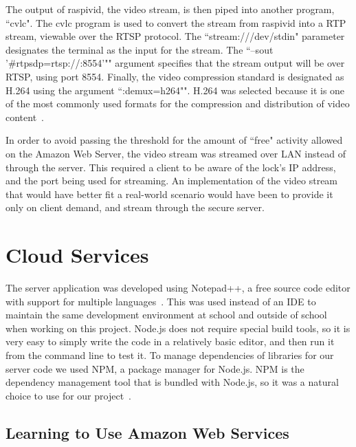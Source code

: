 \documentclass[12pt]{report}
\let\Oldsection\section
\renewcommand{\section}{\FloatBarrier\Oldsection}
\let\Oldsubsection\subsection
\renewcommand{\subsection}{\FloatBarrier\Oldsubsection}
\begin{document}
The output of raspivid, the video stream, is then piped into another program, ``cvlc". The cvlc program is used to 
convert the stream from raspivid into a RTP stream, viewable over the RTSP protocol. The ``stream:///dev/stdin" 
parameter designates the terminal as the input for the stream. The ``--sout '\#rtp{sdp=rtsp://:8554}'"" argument specifies 
that the stream output will be over RTSP, using port 8554. Finally, the video compression standard is designated as 
H.264 using the argument ``:demux=h264"". H.264 was selected because it is one of the most commonly used formats for 
the compression and distribution of video content~\autocite{H264}.

In order to avoid passing the threshold for the amount of ``free" activity allowed on the Amazon Web Server, the video 
stream was streamed over LAN instead of through the server. This required a client to be aware of the lock's IP 
address, and the port being used for streaming. An implementation of the video stream that would have better fit a 
real-world scenario would have been to provide it only on client demand, and stream through the secure server.


\section{Cloud Services} \label{cloud-services}

The server application was developed using Notepad++, a free source code editor with support
for multiple languages~\autocite{NOTEPADPLUSPLUS}. This was used instead of an IDE to maintain the same development
environment at school and outside of school when working on this project. Node.js does not
require special build tools, so it is very easy to simply write the code in a relatively basic
editor, and then run it from the command line to test it. To manage dependencies of libraries
for our server code we used NPM, a package manager for Node.js. NPM is the dependency management
tool that is bundled with Node.js, so it was a natural choice to use for our project~\autocite{NODENPM}.



\subsection{Learning to Use Amazon Web Services} \label{learning-to-use-amazon-web-services}
\end{document}
